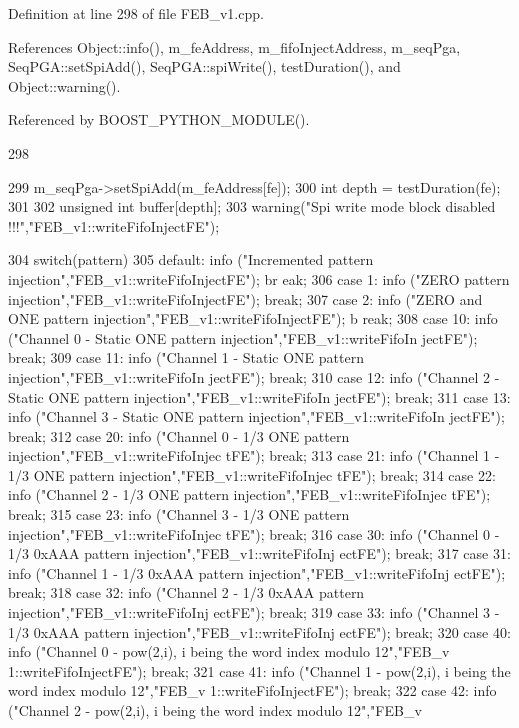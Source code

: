 Definition at line 298 of file FEB\_\-v1.cpp.

References Object::info(), m\_\-feAddress, m\_\-fifoInjectAddress, m\_\-seqPga, SeqPGA::setSpiAdd(), SeqPGA::spiWrite(), testDuration(), and Object::warning().

Referenced by BOOST\_\-PYTHON\_\-MODULE().


\begin{DoxyCode}
298                                                   {
299   m_seqPga->setSpiAdd(m_feAddress[fe]);
300   int depth = testDuration(fe);
301  
302   unsigned int buffer[depth];
303   warning("Spi write mode block disabled !!!","FEB_v1::writeFifoInjectFE");      
        
304   switch(pattern){
305   default: info ("Incremented pattern injection","FEB_v1::writeFifoInjectFE"); br
      eak;
306   case 1:  info ("ZERO pattern injection","FEB_v1::writeFifoInjectFE"); break;
307   case 2:  info ("ZERO and ONE pattern injection","FEB_v1::writeFifoInjectFE"); b
      reak;
308   case 10:  info ("Channel 0 - Static ONE pattern injection","FEB_v1::writeFifoIn
      jectFE"); break;
309   case 11:  info ("Channel 1 - Static ONE pattern injection","FEB_v1::writeFifoIn
      jectFE"); break;
310   case 12:  info ("Channel 2 - Static ONE pattern injection","FEB_v1::writeFifoIn
      jectFE"); break;
311   case 13:  info ("Channel 3 - Static ONE pattern injection","FEB_v1::writeFifoIn
      jectFE"); break;
312   case 20:  info ("Channel 0 - 1/3 ONE pattern injection","FEB_v1::writeFifoInjec
      tFE"); break;
313   case 21:  info ("Channel 1 - 1/3 ONE pattern injection","FEB_v1::writeFifoInjec
      tFE"); break;
314   case 22:  info ("Channel 2 - 1/3 ONE pattern injection","FEB_v1::writeFifoInjec
      tFE"); break;
315   case 23:  info ("Channel 3 - 1/3 ONE pattern injection","FEB_v1::writeFifoInjec
      tFE"); break;
316   case 30:  info ("Channel 0 - 1/3 0xAAA pattern injection","FEB_v1::writeFifoInj
      ectFE"); break;
317   case 31:  info ("Channel 1 - 1/3 0xAAA pattern injection","FEB_v1::writeFifoInj
      ectFE"); break;
318   case 32:  info ("Channel 2 - 1/3 0xAAA pattern injection","FEB_v1::writeFifoInj
      ectFE"); break;
319   case 33:  info ("Channel 3 - 1/3 0xAAA pattern injection","FEB_v1::writeFifoInj
      ectFE"); break;
320   case 40:  info ("Channel 0 - pow(2,i), i being the word index modulo 12","FEB_v
      1::writeFifoInjectFE"); break;
321   case 41:  info ("Channel 1 - pow(2,i), i being the word index modulo 12","FEB_v
      1::writeFifoInjectFE"); break;
322   case 42:  info ("Channel 2 - pow(2,i), i being the word index modulo 12","FEB_v
}}
\end{DoxyCode}
